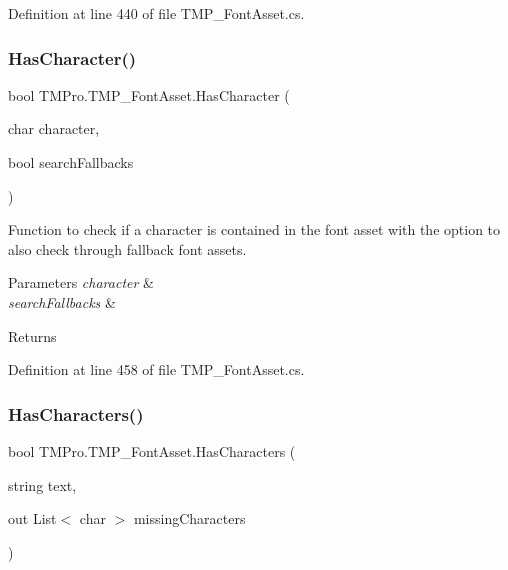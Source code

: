 Definition at line 440 of file T\+M\+P\+\_\+\+Font\+Asset.\+cs.

\mbox{\label{class_t_m_pro_1_1_t_m_p___font_asset_ab31b4d104cf7a6e0776a98d4d9c7ffee}} 
\subsubsection{\texorpdfstring{HasCharacter()}{HasCharacter()}\hspace{0.1cm}{\footnotesize\ttfamily [3/3]}}
{\footnotesize\ttfamily bool T\+M\+Pro.\+T\+M\+P\+\_\+\+Font\+Asset.\+Has\+Character (\begin{DoxyParamCaption}\item[{char}]{character,  }\item[{bool}]{search\+Fallbacks }\end{DoxyParamCaption})}



Function to check if a character is contained in the font asset with the option to also check through fallback font assets. 


\begin{DoxyParams}{Parameters}
{\em character} & \\
\hline
{\em search\+Fallbacks} & \\
\hline
\end{DoxyParams}
\begin{DoxyReturn}{Returns}

\end{DoxyReturn}


Definition at line 458 of file T\+M\+P\+\_\+\+Font\+Asset.\+cs.

\mbox{\label{class_t_m_pro_1_1_t_m_p___font_asset_a8db6e186c97502bee308dfc32f82aa92}} 
\subsubsection{\texorpdfstring{HasCharacters()}{HasCharacters()}\hspace{0.1cm}{\footnotesize\ttfamily [1/2]}}
{\footnotesize\ttfamily bool T\+M\+Pro.\+T\+M\+P\+\_\+\+Font\+Asset.\+Has\+Characters (\begin{DoxyParamCaption}\item[{string}]{text,  }\item[{out List$<$ char $>$}]{missing\+Characters }\end{DoxyParamCaption})}



